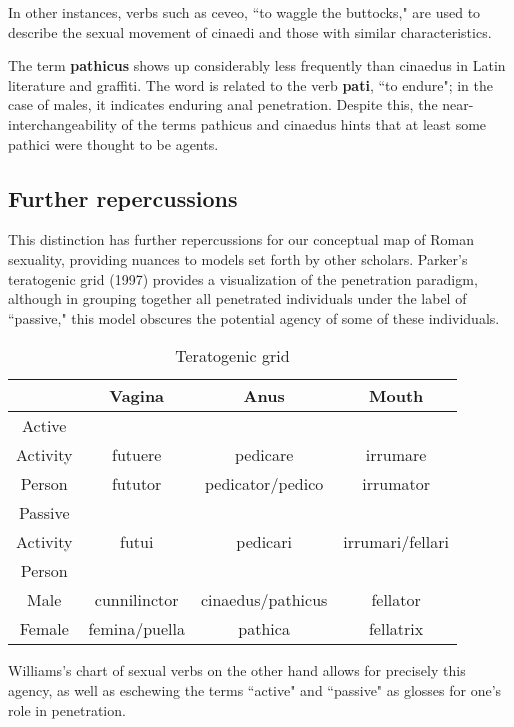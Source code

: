 In other instances, verbs such as ceveo, ``to waggle the buttocks," are used to describe the sexual movement of cinaedi and those with similar characteristics.


The term \textbf{pathicus} shows up considerably less frequently than cinaedus in Latin literature and graffiti. The word is related to the verb \textbf{pati}, ``to endure"; in the case of males, it indicates enduring anal penetration. Despite this, the near-interchangeability of the terms pathicus and cinaedus hints that at least some pathici were thought to be agents.


\subsection{Further repercussions}

This distinction has further repercussions for our conceptual map of Roman sexuality, providing nuances to models set forth by other scholars. Parker's teratogenic grid (1997) provides a visualization of the penetration paradigm, although in grouping together all penetrated individuals under the label of ``passive," this model obscures the potential agency of some of these individuals.

\begin{table}[H]
    \centering
    \caption{Teratogenic grid}
    \begin{tabular}{cccc}
        \hline 
            & Vagina & Anus & Mouth \\ \hline
            Active & & & \\
            Activity & futuere & pedicare & irrumare \\
            Person & fututor & pedicator/pedico & irrumator \\
            Passive & & & \\
            Activity & futui & pedicari & irrumari/fellari \\
            Person & & & \\
            Male & cunnilinctor & cinaedus/pathicus & fellator \\
            Female & femina/puella & pathica & fellatrix \\ \hline
    \end{tabular}
    \label{tab:teratogenic}
\end{table}


Williams's chart of sexual verbs on the other hand allows for precisely this agency, as well as eschewing the terms ``active" and ``passive" as glosses for one's role in penetration.

